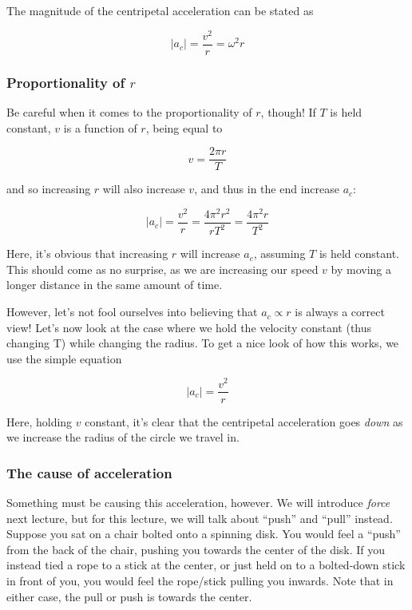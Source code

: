 \documentclass[8.01x]{subfiles}
\begin{document}
The magnitude of the centripetal acceleration can be stated as

\begin{equation}
|a_c| = \frac{v^2}{r} = \omega^2 r
\end{equation}

\subsubsection{Proportionality of $r$}
Be careful when it comes to the proportionality of $r$, though! If $T$ is held constant, $v$ is a function of $r$, being equal to

\begin{equation}
v = \frac{2 \pi r}{T}
\end{equation}

and so increasing $r$ will also increase $v$, and thus in the end increase $a_c$:

\begin{equation}
|a_c| = \frac{v^2}{r} = \frac{4 \pi^2 r^2}{r T^2} = \frac{4 \pi^2 r}{T^2}
\end{equation}

Here, it's obvious that increasing $r$ will increase $a_c$, assuming $T$ is held constant. This should come as no surprise, as we are increasing our speed $v$ by moving a longer distance in the same amount of time.

However, let's not fool ourselves into believing that $a_c \propto r$ is always a correct view! Let's now look at the case where we hold the velocity constant (thus changing T) while changing the radius. To get a nice look of how this works, we use the simple equation

\begin{equation}
|a_c| = \frac{v^2}{r}
\end{equation}

Here, holding $v$ constant, it's clear that the centripetal acceleration goes \emph{down} as we increase the radius of the circle we travel in.

\subsubsection{The cause of acceleration}

Something must be causing this acceleration, however. We will introduce \emph{force} next lecture, but for this lecture, we will talk about ``push'' and ``pull'' instead. Suppose you sat on a chair bolted onto a spinning disk. You would feel a ``push'' from the back of the chair, pushing you towards the center of the disk. If you instead tied a rope to a stick at the center, or just held on to a bolted-down stick in front of you, you would feel the rope/stick pulling you inwards. Note that in either case, the pull or push is towards the center.
\end{document}
